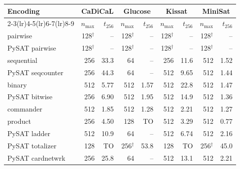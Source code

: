 \begin{tabular}{@{}lrrrrrrrr@{}}
\toprule
Encoding & \multicolumn{2}{c}{CaDiCaL} & \multicolumn{2}{c}{Glucose} & \multicolumn{2}{c}{Kissat} & \multicolumn{2}{c}{MiniSat} \\
\cmidrule(lr){2-3}\cmidrule(lr){4-5}\cmidrule(lr){6-7}\cmidrule(lr){8-9}
 & $n_{\max}$ & $t_{256}$ & $n_{\max}$ & $t_{256}$ & $n_{\max}$ & $t_{256}$ & $n_{\max}$ & $t_{256}$ \\
\midrule
pairwise & 128$^\dagger$ & -- & 128$^\dagger$ & -- & 128$^\dagger$ & -- & 128$^\dagger$ & -- \\
PySAT pairwise & 128$^\dagger$ & -- & 128$^\dagger$ & -- & 128$^\dagger$ & -- & 128$^\dagger$ & -- \\
sequential & 256 & 33.3 & 64 & -- & 256 & 11.6 & 512 & 1.52 \\
PySAT seqcounter & 256 & 44.3 & 64 & -- & 512 & 9.65 & 512 & 1.44 \\
binary & 512 & 5.77 & 512 & 1.57 & 512 & 22.8 & 512 & 1.47 \\
PySAT bitwise & 256 & 6.90 & 512 & 1.95 & 512 & 14.9 & 512 & 1.36 \\
commander & 512 & 1.85 & 512 & 1.28 & 512 & 2.21 & 512 & 1.27 \\
product & 256 & 4.50 & 128 & TO & 512 & 3.29 & 512 & 0.77 \\
\midrule
PySAT ladder & 512 & 10.9 & 64 & -- & 512 & 6.74 & 512 & 2.16 \\
PySAT totalizer & 128 & TO & 256$^\dagger$ & 53.8 & 128 & TO & 256$^\dagger$ & 45.0 \\
PySAT cardnetwrk & 256 & 25.8 & 64 & -- & 512 & 13.1 & 512 & 2.21 \\
\bottomrule
\end{tabular}
